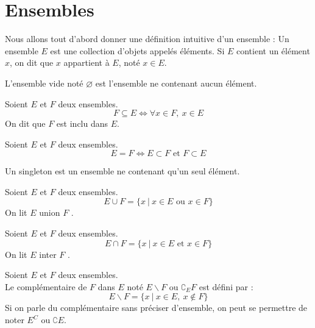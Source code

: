 \chapter{Ensembles}
\def\arraystretch{1}

Nous allons tout d'abord donner une définition intuitive d'un ensemble : Un ensemble $E$ est une collection d'objets appelés éléments. Si $E$ contient un élément $x$, on dit que $x$ appartient à $E$, noté $x \in E$.

\begin{definition}
  L'ensemble vide noté $\varnothing$ est l'ensemble ne contenant aucun élément.
\end{definition}

\begin{definition}[Inclusion]
  Soient $E$ et $F$ deux ensembles.
  $$F \subseteq E \iff \forall x \in F,\ x \in E$$
  On dit que $F$ est inclu dans $E$.
\end{definition}

\begin{definition}
  Soient $E$ et $F$ deux ensembles.
  $$E = F \iff E \subset F \text{ et } F \subset E$$
\end{definition}

\begin{definition}[Singleton]
  Un singleton est un ensemble ne contenant qu'un seul élément.
\end{definition}

\begin{definition}
  Soient $E$ et $F$ deux ensembles.
  \[ E \cup F = \{ x \ | \ x \in E \text{ ou } x \in F \} \]
  On lit \og $E$ union $F$ \fg.
\end{definition}

\begin{definition}
  Soient $E$ et $F$ deux ensembles.
  \[ E \cap F = \{ x \ | \ x \in E \text{ et } x \in F \} \]
  On lit \og $E$ inter $F$ \fg.
\end{definition}

\begin{definition}
  Soient $E$ et $F$ deux ensembles. 
  \\
  Le complémentaire de $F$ dans $E$ noté $E \backslash F$ ou $\complement_E F$ est défini par :
  \[ E \backslash F = \{ x \ | \ x \in E,\ x \notin F \} \]
  Si on parle du complémentaire sans préciser d'ensemble, on peut se permettre de noter $E^C$ ou $\complement E$.
\end{definition}

